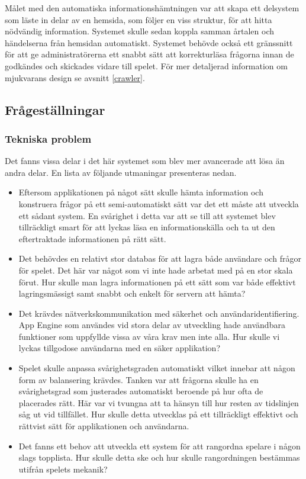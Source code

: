 \documentclass[a4paper, 11pt]{article}
\begin{document}
Målet med den automatiska informationshämtningen var att skapa ett delsystem som läste in delar av en hemsida, som följer en viss struktur, för att hitta nödvändig information. Systemet skulle sedan koppla samman årtalen och händelserna från hemsidan automatiskt. Systemet behövde också ett gränssnitt för att ge administratörerna ett snabbt sätt att korrekturläsa frågorna innan de godkändes och skickades vidare till spelet. För mer detaljerad information om mjukvarans design se avsnitt \ref{crawler}.

\subsection{Frågeställningar}

\subsubsection{Tekniska problem}
Det fanns vissa delar i det här systemet som blev mer avancerade att lösa än andra delar. En lista av följande utmaningar presenteras nedan.
\begin{itemize}
\item Eftersom applikationen på något sätt skulle hämta information och konstruera frågor på ett semi-automatiskt sätt var det ett måste att utveckla ett sådant system. En svårighet i detta var att se till att systemet blev tillräckligt smart för att lyckas läsa en informationskälla och ta ut den eftertraktade informationen på rätt sätt.
\item Det behövdes en relativt stor databas för att lagra både användare och frågor för spelet. Det här var något som vi inte hade arbetat med på en stor skala förut. Hur skulle man lagra informationen på ett sätt som var både effektivt lagringsmässigt samt snabbt och enkelt för servern att hämta?
\item Det krävdes nätverkskommunikation med säkerhet och användaridentifiering. App Engine som användes vid stora delar av utveckling hade användbara funktioner som uppfyllde vissa av våra krav men inte alla. Hur skulle vi lyckas tillgodose användarna med en säker applikation?
\item Spelet skulle anpassa svårighetsgraden automatiskt vilket innebar att någon form av balansering krävdes. Tanken var att frågorna skulle ha en svårighetsgrad som justerades automatiskt beroende på hur ofta de placerades rätt. Här var vi tvungna att ta hänsyn till hur resten av tidslinjen såg ut vid tillfället. Hur skulle detta utvecklas på ett tillräckligt effektivt och rättvist sätt för applikationen och användarna.
\item Det fanns ett behov att utveckla ett system för att rangordna spelare i någon slags topplista. Hur skulle detta ske och hur skulle rangordningen bestämmas utifrån spelets mekanik? 
\end{itemize}
\end{document}
